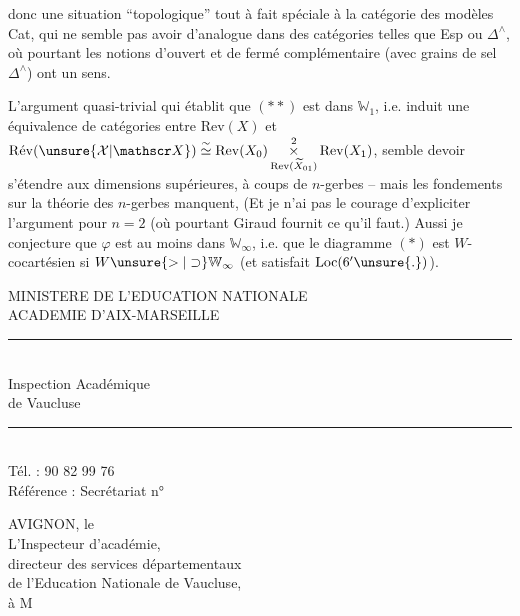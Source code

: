 
donc une situation ``topologique'' tout à fait spéciale à la catégorie des modèles Cat, qui ne semble pas avoir d'analogue dans des catégories telles que Esp ou $\Delta^{\wedge}$, où pourtant les notions d'ouvert et de fermé complémentaire (avec grains de sel  $\Delta^{\wedge}$) ont un sens.

L'argument  quasi-trivial qui établit que $(**)$  est dans $\mathbb W_1$, i.e. induit une équivalence de catégories entre $\mathrm{Rev}(X)$ et $\mathrm{R\acute{e}v}(\unsure{\mathcal X|\mathscr X})\overset{\sim}{\simeq}\mathrm{Rev}(X_0)\mathop{\times}\limits^{2}_{\mathrm{Rev}(\widetilde X_{01})}\mathrm{Rev}(X_1)$,  semble devoir s'étendre aux dimensions supérieures, à coups de $n$-gerbes  -- mais les fondements sur la théorie des $n$-gerbes  manquent, (Et je n'ai pas le courage d'expliciter l'argument pour $n=2$ (où pourtant Giraud fournit ce qu'il faut.) Aussi je conjecture que $\varphi$ est  au moins dans $\mathbb W_\infty$, i.e. que le diagramme $(*)$ est $W$-cocartésien si $W\unsure{>|\supset}\mathbb W_\infty$ (et satisfait $\mathrm{Loc}(6'\unsure{.})$).


\noindent\begin{minipage}[t]{.48\linewidth}\centering
MINISTERE DE L’EDUCATION NATIONALE\\
ACADEMIE D’AIX-MARSEILLE\\
\rule{2em}{.3pt}\\[.5em]
Inspection Académique\\
de Vaucluse\\
\rule{2em}{.3pt}\\[.5em]
Tél. : 90 82 99 76\\[.5em]
Référence : Secrétariat n°
\end{minipage}\hfill
\begin{minipage}[t]{.48\linewidth}
AVIGNON, le\\[2.5em]
L’Inspecteur d’académie,\\
directeur des services départementaux\\
de l’Education Nationale de Vaucluse,\\[2em]
à M
\end{minipage}

